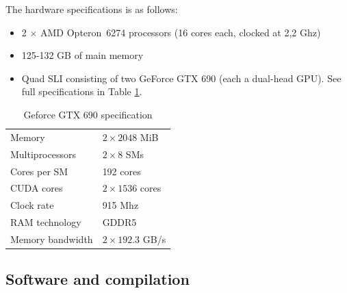 The hardware specifications is as follows:

\begin{itemize}
\item 2 $\times$ AMD Opteron\texttrademark\ 6274 processors (16 cores each, clocked at 2,2 Ghz)
\item 125-132 GB of main memory 
\item Quad SLI consisting of two GeForce GTX 690 (each a dual-head GPU). See full specifications in Table \ref{tab:hardware}.
\end{itemize}

\begin{table}
  \centering
  \begin{tabular}{ll}
    Memory & $2 \times 2048$ MiB \\
    Multiprocessors & $2 \times 8$ SMs\\
    Cores per SM & 192 cores \\
    CUDA cores & $2 \times 1536$ cores\\
    Clock rate & 915 Mhz \\
    RAM technology & GDDR5 \\
    Memory bandwidth & $2 \times 192.3$ GB/s \\
    \hline
  \end{tabular}
  \caption{Geforce GTX 690 specification}
  \label{tab:hardware}
\end{table}


\subsection{Software and compilation}




